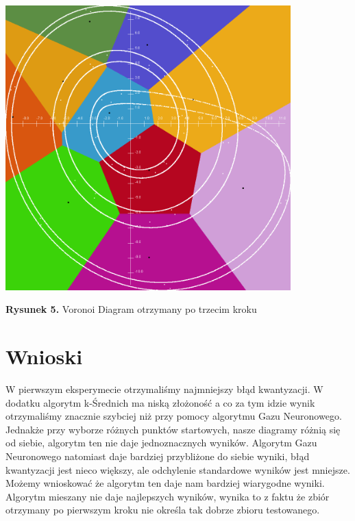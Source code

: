 \documentclass{classrep}
\begin{document}
\begin{center}
	\includegraphics[height=11cm]{mieszany3.png}
	
	
	\textbf{Rysunek 5.} Voronoi Diagram otrzymany po trzecim kroku
\end{center}

\section{Wnioski}
W pierwszym eksperymecie otrzymaliśmy najmniejszy błąd kwantyzacji. W dodatku algorytm k-Średnich ma niską złożoność a co za tym idzie wynik otrzymaliśmy znacznie szybciej niż przy pomocy algorytmu Gazu Neuronowego. Jednakże przy wyborze różnych punktów startowych, nasze diagramy różnią się od siebie, algorytm ten nie daje jednoznacznych wyników. Algorytm Gazu Neuronowego natomiast daje bardziej przybliżone do siebie wyniki, błąd kwantyzacji jest nieco większy, ale odchylenie standardowe wyników jest mniejsze. Możemy wnioskować że algorytm ten daje nam bardziej wiarygodne wyniki. Algorytm mieszany nie daje najlepszych wyników, wynika to z faktu że zbiór otrzymany po pierwszym kroku nie określa tak dobrze zbioru testowanego.
\end{document}
